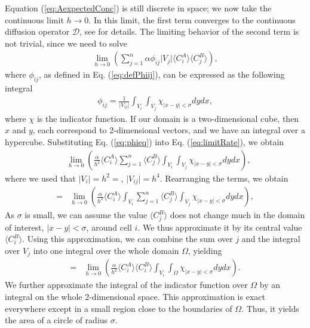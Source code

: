\documentclass[10pt,twocolumn]{revtex4-1}
\begin{document}
	Equation (\ref{eq:AexpectedConc}) is still discrete in space; we now take the continuous limit $h\rightarrow 0$. In this limit, the first term converges to the continuous diffusion operator $\mathcal{D}$, see \cite{del2018grand, wang2003robust} for details. The limiting behavior of the second term is not trivial, since we need to solve
	\begin{align}
	\lim_{h\rightarrow 0} \left( \sum_{j=1}^n 
	\alpha \phi_{ij}\vert V_j \vert \langle C^A_i\rangle \langle C^B_j \rangle \right),
	\label{eq:limitRate}
	\end{align}    
	where $\phi_{ij}$, as defined in Eq. (\ref{eq:defPhiij}), can be expressed as the following integral
	\begin{align}
	\phi_{ij}=\frac{1}{\vert V_{ij}\vert}\int_{V_{i}}\int_{V_{j}}\chi_{\vert x-y\vert <\sigma} dydx,
	\label{eq:phieq}
	\end{align}
	where $\chi$ is the indicator function.
	If our domain is  a two-dimensional cube, then $x$ and $y$, each correspond to 2-dimensional vectors, and we have an integral over a hypercube. Substituting Eq. (\ref{eq:phieq}) into Eq. (\ref{eq:limitRate}), we obtain
	\begin{align*}
	&\lim_{h\rightarrow 0} \left( \frac{\alpha}{h^2} \langle C^A_i\rangle \sum_{j=1}^n 
	\langle C^B_j \rangle \int_{V_i}\int_{V_j}\chi_{\vert x-y\vert <\sigma} dydx \right),
	\end{align*}
	where we used that $\vert V_i \vert = h^2 =$, $\vert V_{ij} \vert = h^4$. Rearranging the terms, we obtain
	\begin{align*}
	=&\lim_{h\rightarrow 0} \left( \frac{\alpha }{h^2} \langle C^A_i\rangle \int_{V_i}
	\sum_{j=1}^n \langle C^B_j \rangle\int_{V_j}\chi_{\vert x-y\vert <\sigma} dydx \right),    
	\end{align*}
	As $\sigma$ is small, we can assume the value $\langle C^B_j \rangle$ does not change much in the domain of interest, $\vert x-y\vert <\sigma$, around cell $i$. We thus approximate it by its central value $\langle C^B_i \rangle$. Using this approximation, we can combine the sum over $j$ and the integral over $V_j$ into one integral over the whole domain $\Omega$, yielding
	\begin{align*}
	= & \lim_{h\rightarrow 0} \left(\frac{\alpha}{h^2}  \langle C^A_i\rangle \langle C^B_i \rangle\int_{V_i} \int_{\Omega}\chi_{\vert x-y\vert <\sigma} dydx \right).
	\end{align*}
	We further approximate the integral of the indicator function over $\Omega$ by an integral on the whole 2-dimensional space. This approximation is exact everywhere except in a small region close to the boundaries of $\Omega$. Thus, it yields the area of a circle of radius $\sigma$. 
\end{document}
